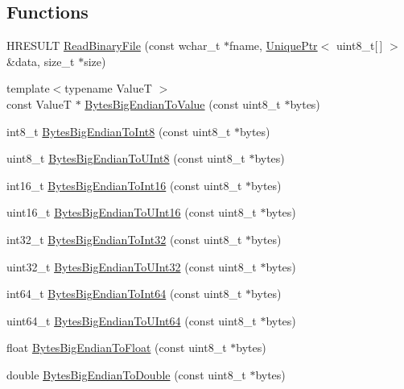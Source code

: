 \subsection*{Functions}
\begin{DoxyCompactItemize}
\item 
H\+R\+E\+S\+U\+LT \hyperlink{namespacemage_a30683d9d7214e9b340b5cb225a8b3467}{Read\+Binary\+File} (const wchar\+\_\+t $\ast$fname, \hyperlink{namespacemage_a8c307fbcc33bce9b7f2aa4c26c3b95cf}{Unique\+Ptr}$<$ uint8\+\_\+t\mbox{[}$\,$\mbox{]} $>$ \&data, size\+\_\+t $\ast$size)
\item 
{\footnotesize template$<$typename ValueT $>$ }\\const ValueT $\ast$ \hyperlink{namespacemage_a5f6d31e3bcd9b047c2dfe8fa90d4092d}{Bytes\+Big\+Endian\+To\+Value} (const uint8\+\_\+t $\ast$bytes)
\item 
int8\+\_\+t \hyperlink{namespacemage_a7dd5ebfc406cb1d6a8a403a8db29af36}{Bytes\+Big\+Endian\+To\+Int8} (const uint8\+\_\+t $\ast$bytes)
\item 
uint8\+\_\+t \hyperlink{namespacemage_a89be63c40055cf211d63423bb25be1cc}{Bytes\+Big\+Endian\+To\+U\+Int8} (const uint8\+\_\+t $\ast$bytes)
\item 
int16\+\_\+t \hyperlink{namespacemage_a67572c654c8ede11eed23c9c556e439f}{Bytes\+Big\+Endian\+To\+Int16} (const uint8\+\_\+t $\ast$bytes)
\item 
uint16\+\_\+t \hyperlink{namespacemage_a90b2972b7a2a01d4a911d071303bc400}{Bytes\+Big\+Endian\+To\+U\+Int16} (const uint8\+\_\+t $\ast$bytes)
\item 
int32\+\_\+t \hyperlink{namespacemage_ae98f64655a7d791c6c6efba16ce6b8e8}{Bytes\+Big\+Endian\+To\+Int32} (const uint8\+\_\+t $\ast$bytes)
\item 
uint32\+\_\+t \hyperlink{namespacemage_aab7d431dcaf0965028de7c5dee9c3da4}{Bytes\+Big\+Endian\+To\+U\+Int32} (const uint8\+\_\+t $\ast$bytes)
\item 
int64\+\_\+t \hyperlink{namespacemage_a52f6dec57a9c644e912a88f8cfabe199}{Bytes\+Big\+Endian\+To\+Int64} (const uint8\+\_\+t $\ast$bytes)
\item 
uint64\+\_\+t \hyperlink{namespacemage_a7509f9c1a6cf98056f2deaa8a2f45c7c}{Bytes\+Big\+Endian\+To\+U\+Int64} (const uint8\+\_\+t $\ast$bytes)
\item 
float \hyperlink{namespacemage_ae184a2848f1a490c58f617a9d93b3c88}{Bytes\+Big\+Endian\+To\+Float} (const uint8\+\_\+t $\ast$bytes)
\item 
double \hyperlink{namespacemage_a348085d95b0f0d2276cf9fad8a8d8b1d}{Bytes\+Big\+Endian\+To\+Double} (const uint8\+\_\+t $\ast$bytes)

\end{DoxyCompactItemize}

